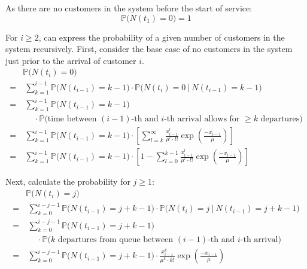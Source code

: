 As there are no customers in the system before the start of service:
\begin{equation}
	\mathbb{P} \Big( N (t_{1}) = 0 \Big) = 1
\end{equation}

For $i \geq 2$, can express the probability of a given number of customers in the system recursively. First, consider the base case of no customers in the system just prior to the arrival of customer $i$.
\begin{align*}
	& \mathbb{P} \Big( N (t_{i}) = 0 \Big) \\
	= & \ \sum_{k = 1}^{i - 1} \mathbb{P} \Big( N (t_{i - 1}) = k - 1 \Big) \cdot \mathbb{P} \Big( N (t_{i}) = 0 \ \Big| \ N (t_{i - 1}) = k - 1 \Big) \\
	= & \ \sum_{k = 1}^{i - 1} \mathbb{P} \Big( N (t_{i - 1})= k - 1 \Big) \\
	& \ \ \ \ \ \ \cdot \mathbb{P} \Big( \text{time between $(i - 1)$-th and $i$-th arrival allows for $\geq k$ departures} \Big) \\
	= & \ \sum_{k = 1}^{i - 1} \mathbb{P} \Big( N (t_{i - 1}) = k - 1 \Big) \cdot \left[ \sum_{l = k}^{\infty} \frac{x_{i - 1}^{l}}{\mu^{l} \cdot l!} \exp \left( \frac{- x_{i - 1}}{\mu} \right) \right] \\
	= & \ \sum_{k = 1}^{i - 1} \mathbb{P} \Big( N (t_{i - 1}) = k - 1 \Big) \cdot \left[ 1 - \sum_{l = 0}^{k - 1} \frac{x_{i - 1}^{l}}{\mu^{l} \cdot l!} \exp \left( \frac{- x_{i - 1}}{\mu} \right) \right]
\end{align*}

Next, calculate the probability for $j \geq 1$:
\begin{align*}
	& \mathbb{P} \Big( N (t_{i}) = j \Big) \\
	= & \ \sum_{k = 0}^{i - j - 1} \mathbb{P} \Big( N (t_{i - 1}) = j + k - 1 \Big) \cdot \mathbb{P} \Big( N (t_{i}) = j \ \Big| \ N (t_{i - 1}) = j + k - 1 \Big) \\
	= & \ \sum_{k = 0}^{i - j - 1} \mathbb{P} \Big( N (t_{i - 1}) = j + k - 1 \Big) \\
	& \ \ \ \ \ \ \cdot \mathbb{P} \Big( \text{$k$ departures from queue between $(i - 1)$-th and $i$-th arrival} \Big) \\
	= & \ \sum_{k = 0}^{i - j - 1} \mathbb{P} \Big( N (t_{i - 1}) = j + k - 1 \Big) \cdot \frac{x_{i - 1}^{k}}{\mu^{k} \cdot k!} \exp \left( \frac{- x_{i - 1}}{\mu} \right)
\end{align*}

